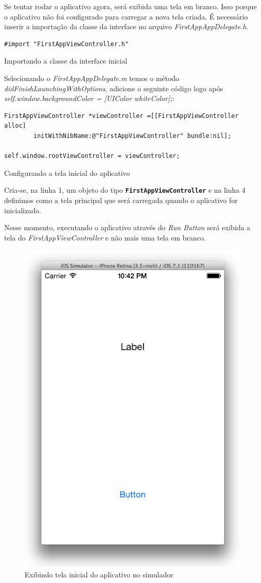 \documentclass[a4paper,12pt,brazil,oneside]{book}
\begin{document}
Se tentar rodar o aplicativo agora, será exibida uma tela em branco. Isso porque o aplicativo não foi configurado para carregar a nova tela criada. É necessário inserir a importação da classe da interface no arquivo \emph{FirstAppAppDelegate.h}.

\begin{listing}[H]
\begin{verbatim}
#import "FirstAppViewController.h"
\end{verbatim}
\caption{Importando a classe da interface inicial}
\end{listing}


Selecionando o \emph{FirstAppAppDelegate.m} temos o método \emph{didFinishLaunchingWithOptions}, adicione o seguinte código logo após \emph{self.window.backgroundColor = [UIColor whiteColor];}:

\begin{listing}[H]
\begin{verbatim}
FirstAppViewController *viewController =[[FirstAppViewController alloc] 
		initWithNibName:@"FirstAppViewController" bundle:nil];
		
self.window.rootViewController = viewController;    
\end{verbatim}
\caption{Configurando a tela inicial do aplicativo}
\end{listing}


Cria-se, na linha 1, um objeto do tipo \texttt{\textbf{FirstAppViewController}} e na linha 4 definimos como a tela principal que será carregada quando o aplicativo for inicializado. 

Nesse momento, executando o aplicativo através do \emph{Run Button} será exibida a tela do \emph{FirstAppViewController} e não mais uma tela em branco.

\begin{figure}[H]
  \centering
  \includegraphics[width=.55\textwidth]{figuras/3/tela_novo_projeto_18.png}
  \caption{Exibindo tela inicial do aplicativo no simulador}
  \label{fig:a}
\end{figure}
\end{document}
